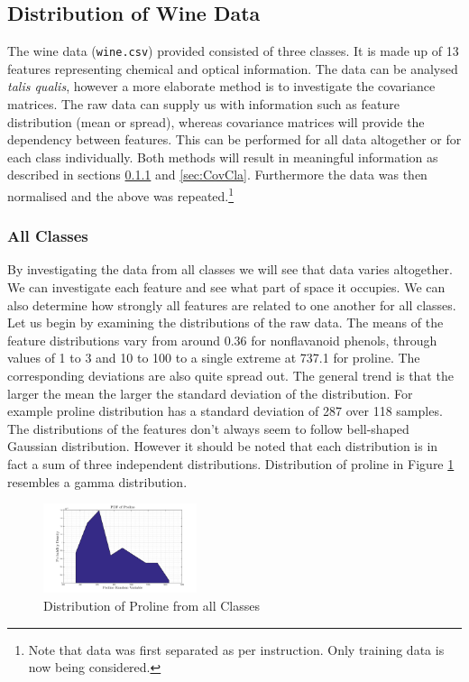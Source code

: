 \documentclass[10pt,twocolumn,letterpaper]{article}
\begin{document}
\subsection{Distribution of Wine Data}

The wine data ({\tt\small wine.csv}) provided consisted of three classes. It is made up of 13 features representing chemical and optical information. The data can be analysed \textit{talis qualis}, however a more elaborate method is to investigate the covariance matrices. The raw data can supply us with information such as feature distribution (mean or spread), whereas covariance matrices will provide the dependency between features. This can be performed for all data altogether or for each class individually. Both methods will result in meaningful information as described in sections \ref{sec:CovAll} and \ref{sec:CovCla}. Furthermore the data was then normalised and the above was repeated.\footnote{Note that data was first separated as per instruction. Only training data is now being considered.} 

\vspace{-3mm}

\subsubsection{All Classes} \label{sec:CovAll}

\indent \indent By investigating the data from all classes we will see that data varies altogether. We can investigate each feature and see what part of space it occupies. We can also determine how strongly all features are related to one another for all classes. Let us begin by examining the distributions of the raw data. The means of the feature distributions vary from around 0.36 for nonflavanoid phenols, through values of 1 to 3 and 10 to 100 to a single extreme at 737.1 for proline. The corresponding deviations are also quite spread out. The general trend is that the larger the mean the larger the standard deviation of the distribution. For example proline distribution has a standard deviation of 287 over 118 samples. The distributions of the features don't always seem to follow bell-shaped Gaussian distribution. However it should be noted that each distribution is in fact a sum of three independent distributions. Distribution of proline in Figure \ref{fig:DistProline} resembles a gamma distribution.

\begin{figure}[H]
\centering
\includegraphics[width=0.4\textwidth]{../results/Q1_ProlineDist}
\caption{Distribution of Proline from all Classes \label{fig:DistProline}}
\end{figure}
\end{document}
